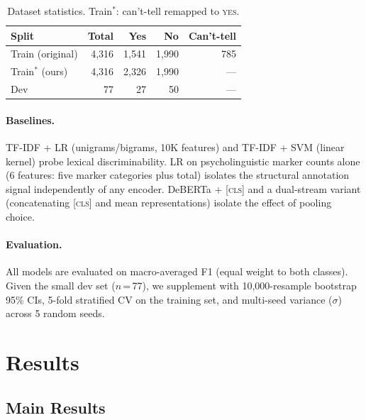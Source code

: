 \documentclass[11pt]{article}
\begin{document}
\begin{table}[t]
\centering\small
\begin{tabular}{@{}lrrrr@{}}
\toprule
\textbf{Split} & \textbf{Total} & \textbf{Yes} & \textbf{No} & \textbf{Can't-tell} \\
\midrule
Train (original) & 4,316 & 1,541 & 1,990 & 785 \\
Train$^*$ (ours) & 4,316 & 2,326 & 1,990 & --- \\
Dev              &    77 &    27 &    50 & --- \\
\bottomrule
\end{tabular}
\caption{Dataset statistics. Train$^*$: can't-tell remapped to \textsc{yes}.}
\label{tab:data}
\end{table}

\paragraph{Baselines.}
TF-IDF + LR (unigrams/bigrams, 10K features) and TF-IDF + SVM (linear kernel) probe lexical discriminability.
LR on psycholinguistic marker counts alone (6 features: five marker categories plus total) isolates the structural annotation signal independently of any encoder.
DeBERTa + \textsc{[cls]} and a dual-stream variant (concatenating \textsc{[cls]} and mean representations) isolate the effect of pooling choice.

\paragraph{Evaluation.}
All models are evaluated on macro-averaged F1 (equal weight to both classes).
Given the small dev set ($n$\,=\,77), we supplement with 10,000-resample bootstrap 95\% CIs, 5-fold stratified CV on the training set, and multi-seed variance ($\sigma$) across 5 random seeds.

\section{Results}
\label{sec:results}

\subsection{Main Results}
\end{document}
